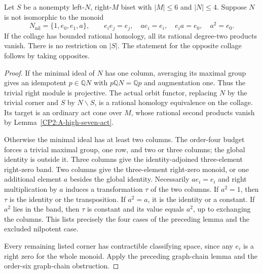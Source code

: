 \begin{theorem}
\label{CP2:A-six-versus-four-semisimple-quotient}
Let $S$ be a nonempty left-$N$, right-$M$ biset with
$|M|\le6$ and $|N|\le4$.  Suppose $N$ is not isomorphic
to the monoid
\[
 N_{\mathrm{nil}}=\{1,e_0,e_1,a\},\qquad
 e_i e_j=e_j,\quad ae_i=e_i,\quad e_i a=e_0,
 \quad a^2=e_0.
\]
If the collage has bounded rational homology, all its
rational degree-two products vanish.  There is no
restriction on $|S|$.  The statement for the opposite
collage follows by taking opposites.
\end{theorem}
\begin{proof}
If the minimal ideal of $N$ has one column, averaging
its maximal group gives an idempotent $p\in\mathbb QN$
with $p\mathbb QN=\mathbb Qp$ and augmentation one.
Thus the trivial right module is projective.  The
actual orbit functor, replacing $N$ by the trivial
corner and $S$ by $N\backslash S$, is a rational
homology equivalence on the collage.  Its target is
an ordinary act cone over $M$, whose rational second
products vanish by Lemma~\ref{CP2:A-high-seven-act}.

Otherwise the minimal ideal has at least two columns.
The order-four budget forces a trivial maximal group,
one row, and two or three columns; the global identity
is outside it.  Three columns give the identity-adjoined
three-element right-zero band.  Two columns give the
three-element right-zero monoid, or one additional
element $a$ besides the global identity.  Necessarily
$ae_i=e_i$ and right multiplication by $a$ induces a
transformation $\tau$ of the two columns.  If $a^2=1$,
then $\tau$ is the identity or the transposition.  If
$a^2=a$, it is the identity or a constant.  If $a^2$
lies in the band, then $\tau$ is constant and its
value equals $a^2$, up to exchanging the columns.
This lists precisely the four cases of the preceding
lemma and the excluded nilpotent case.

Every remaining listed corner has contractible
classifying space, since any $e_i$ is a right zero
for the whole monoid.  Apply the preceding graph-chain
lemma and the order-six graph-chain obstruction.
\end{proof}
